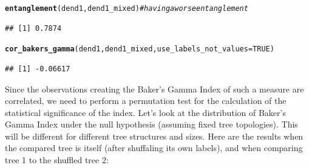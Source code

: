 \documentclass[shortnames,nojss,article]{jss}\usepackage[]{graphicx}\usepackage[]{color}
\makeatletter
\newcommand{\hlnum}[1]{\textcolor[rgb]{0.686,0.059,0.569}{#1}}%
\newcommand{\hlcom}[1]{\textcolor[rgb]{0.678,0.584,0.686}{\textit{#1}}}%
\newcommand{\hlstd}[1]{\textcolor[rgb]{0.345,0.345,0.345}{#1}}%
\newcommand{\hlkwc}[1]{\textcolor[rgb]{0.333,0.667,0.333}{#1}}%
\newcommand{\hlkwd}[1]{\textcolor[rgb]{0.737,0.353,0.396}{\textbf{#1}}}%
\newenvironment{kframe}{%
 \def\at@end@of@kframe{}%
 \ifinner\ifhmode%
  \def\at@end@of@kframe{\end{minipage}}%
  \begin{minipage}{\columnwidth}%
 \fi\fi%
 \def\FrameCommand##1{\hskip\@totalleftmargin \hskip-\fboxsep
 \colorbox{shadecolor}{##1}\hskip-\fboxsep
     \hskip-\linewidth \hskip-\@totalleftmargin \hskip\columnwidth}%
 \MakeFramed {\advance\hsize-\width
   \@totalleftmargin\z@ \linewidth\hsize
   \@setminipage}}%
 {\par\unskip\endMakeFramed%
 \at@end@of@kframe}
\newenvironment{knitrout}{}{} %
\makeatother
\begin{document}
\begin{knitrout}
\begin{kframe}\begin{alltt}
\hlkwd{entanglement}\hlstd{(dend1, dend1_mixed)}  \hlcom{# having a worse entanglement }
\end{alltt}
\begin{verbatim}
## [1] 0.7874
\end{verbatim}
\begin{alltt}
\hlkwd{cor_bakers_gamma}\hlstd{(dend1, dend1_mixed,} \hlkwc{use_labels_not_values} \hlstd{=} \hlnum{TRUE}\hlstd{)}
\end{alltt}
\begin{verbatim}
## [1] -0.06617
\end{verbatim}
\begin{alltt}

\end{alltt}
\end{kframe}
\end{knitrout}



Since the observations creating the Baker's Gamma Index of such a measure are correlated, we need to perform a permutation test for the calculation of the statistical significance of the index. Let's look at the distribution of Baker's Gamma Index under the null hypothesis (assuming fixed tree topologies). This will be different for different tree structures and sizes. Here are the results when the compared tree is itself (after shuffaling its own labels), and when comparing tree 1 to the shuffled tree 2:
\end{document}
